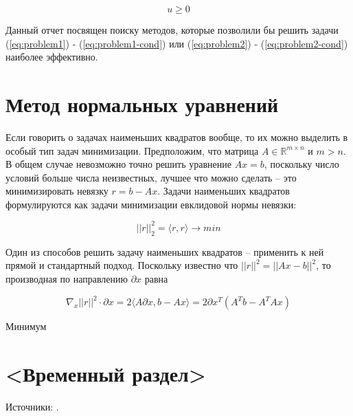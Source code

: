 \documentclass[a4paper, 12pt, titlepage]{article}
\theoremstyle{definition}
\theoremstyle{plain}
\theoremstyle{plain}
\begin{document}
\begin{equation}
 u \geq 0
\end{equation}

Данный отчет посвящен поиску методов, которые позволили бы решить задачи
(\ref{eq:problem1}) - (\ref{eq:problem1-cond}) или (\ref{eq:problem2}) -
(\ref{eq:problem2-cond}) наиболее эффективно.

\section{Метод нормальных уравнений}

Если говорить о задачах наименьших квадратов вообще, то их можно выделить в
особый тип задач минимизации. Предположим, что матрица $A \in \mathbb{R}^{m
\times n}$ и $m > n$. В общем случае невозможно точно решить уравнение
$A x = b$, поскольку число условий больше числа неизвестных, лучшее что можно
сделать -- это минимизировать невязку $r = b - A x$. Задачи наименьших
квадратов формулируются как задачи минимизации евклидовой нормы невязки:

$$
||r||^{2}_{2} = \langle r, r \rangle \to min
$$

Один из способов решить задачу наименьших квадратов -- применить к ней прямой
и стандартный подход. Поскольку известно что $||r||^{2} = ||A x - b||^{2}$, то
производная по направлению $\partial x$ равна

$$
\nabla_{x} ||r||^{2} \cdot \partial x = 2 \langle A \partial x, b - A x\rangle =
2 \partial x^{T} (A^{T} b - A^{T} A x)
$$

Минимум

\section{<Временный раздел>}

Источники: \cite{BertsekasTsitsiklis1989, BierlaireTointTuyttens1991,
CantarellaPiatek2004, ChenDonohoSaunders2001, Golub1965, Lanczos1950,
PaigeSaunders1982, Saunders2013}.

\newpage


\end{document}
